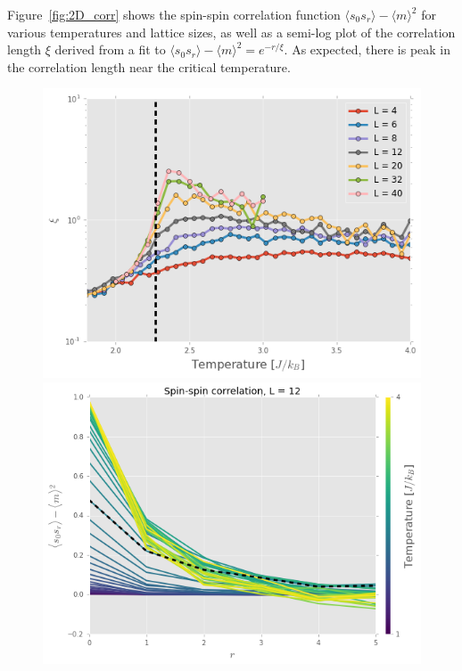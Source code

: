 \documentclass[11pt, oneside]{article}
\begin{document}
Figure~\ref{fig:2D_corr} shows the spin-spin correlation function $\langle{s_0s_r}\rangle-\langle{m}\rangle^2$ for various temperatures and lattice sizes, as well as a semi-log plot of the correlation length $\xi$ derived from a fit to $\langle{s_0s_r}\rangle-\langle{m}\rangle^2=e^{-r/\xi}$. As expected, there is peak in the correlation length near the critical temperature.
\begin{figure}
\begin{minipage}{0.47\textwidth}
    \includegraphics[width=\linewidth]{img/2D/xi_T}
    \end{minipage}
    \hspace{\fill} %
    \begin{minipage}{0.47\textwidth}
    \includegraphics[width=\linewidth]{img/2D/spinspin12}
    \end{minipage}
    

\end{figure}
\end{document}

